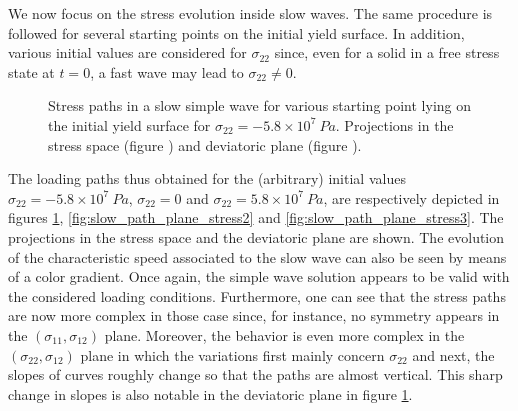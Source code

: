 We now focus on the stress evolution inside slow waves.
The same procedure is followed for several starting points on the initial yield surface.
In addition, various initial values are considered for $\sigma_{22}$ since, even for a solid in a free stress state at $t=0$, a fast wave may lead to $\sigma_{22}\neq 0$.
\begin{figure}[h!]
  \centering
  \caption{Stress paths in a slow simple wave for various starting point lying on the initial yield surface for $\sigma_{22}=-5.8\times 10^7 \: Pa$. Projections in the stress space (figure )  and deviatoric plane (figure ).}
  \label{fig:slow_path_plane_stress1}
\end{figure}
The loading paths thus obtained for the (arbitrary) initial values $\sigma_{22}=-5.8\times 10^7 \: Pa$, $\sigma_{22}=0$ and $\sigma_{22}=5.8\times 10^7 \: Pa$, are respectively depicted in figures \ref{fig:slow_path_plane_stress1}, \ref{fig:slow_path_plane_stress2} and \ref{fig:slow_path_plane_stress3}.
The projections in the stress space and the deviatoric plane are shown.
The evolution of the characteristic speed associated to the slow wave can also be seen by means of a color gradient.
Once again, the simple wave solution appears to be valid with the considered loading conditions.
Furthermore, one can see that the stress paths are now more complex in those case since, for instance, no symmetry appears in the $(\sigma_{11},\sigma_{12})$ plane.
Moreover, the behavior is even more complex in the $(\sigma_{22},\sigma_{12})$ plane in which the variations first mainly concern $\sigma_{22}$ and next, the slopes of curves roughly change so that the paths are almost vertical.
This sharp change in slopes is also notable in the deviatoric plane in figure \ref{fig:slow_path_plane_stress1}.

